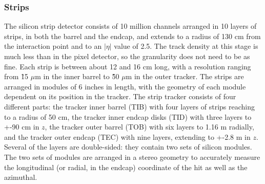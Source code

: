 \subsubsection{Strips}
\label{exp:strips}
The silicon strip detector consists of 10 million channels
arranged in 10 layers of strips, 
in both the barrel and the endcap,
and extends to a radius of 130 cm from the interaction point
and to an $|\eta|$ value of 2.5.  
The track density at this stage is much less than in the pixel detector,
so the granularity does not need to be as fine.
Each strip is between about 12 and 16 cm long,
with a resolution ranging from \~15 $\mu$m in the inner barrel
to \~50 $\mu$m in the outer tracker.  
The strips are arranged in modules of 6 inches in length, 
with the geometry of each module dependent 
on its position in the tracker.  
The strip tracker consists of four different parts: 
the tracker inner barrel (TIB) with four layers of strips reaching to a radius of 50 cm, 
the tracker inner endcap disks (TID) with three layers to +-90 cm in $z$, 
the tracker outer barrel (TOB) with six layers to 1.16 m radially, 
and the tracker outer endcap (TEC) with nine layers, extending to +-2.8 m in $z$. 
Several of the layers are double-sided: 
they contain two sets of silicon modules.  
The two sets of modules are arranged in a stereo
geometry to accurately measure the longitudinal
(or radial, in the endcap) coordinate of the hit 
as well as the azimuthal.  


